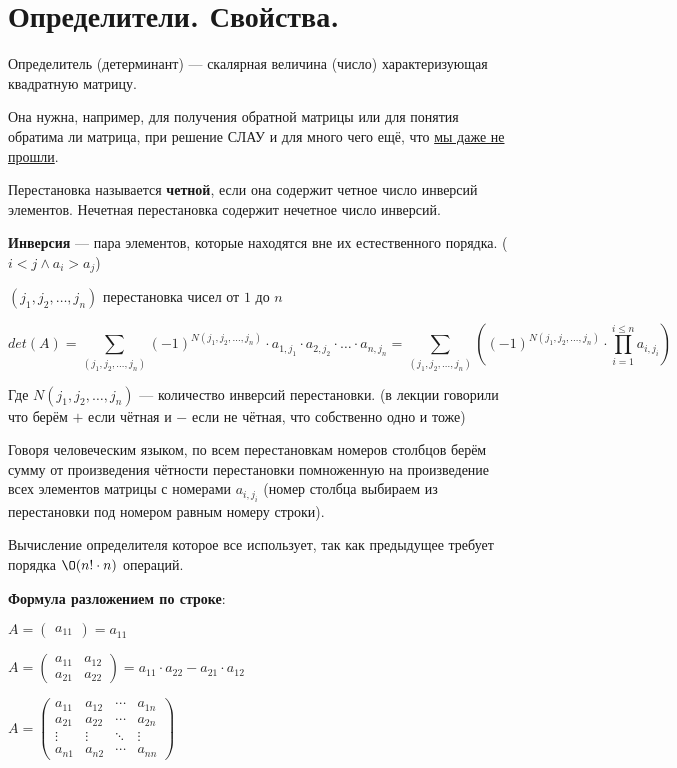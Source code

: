 \section{Определители. Свойства.}

Определитель (детерминант) --- скалярная величина (число) характеризующая квадратную матрицу.

Она нужна, например, для получения обратной матрицы или для понятия обратима ли матрица, при решение СЛАУ и для много чего ещё, что \href{https://math.stackexchange.com/a/160792}{мы даже не прошли}.

Перестановка называется {\bf четной}, если она содержит четное число инверсий элементов. Нечетная перестановка содержит нечетное число инверсий.  

{\bf Инверсия} --- пара элементов, которые находятся вне их естественного порядка. ($i < j \land a_i > a_j$)

$(j_1, j_2, \dots, j_n)$ перестановка чисел от $1$ до $n$

$$\displaystyle det(A) = \sum_{(j_1, j_2, \dots, j_n)} (-1) ^ {N(j_1, j_2, \dots, j_n)} \cdot a_{1, j_1}  \cdot a_{2, j_2} \cdot \dots \cdot  a_{n, j_n}  = \sum_{(j_1, j_2, \dots, j_n)} \left( (-1) ^ {N(j_1, j_2, \dots, j_n)} \cdot \prod_{i=1}^{i\le n} a_{i, j_i} \right)$$

Где $N(j_1, j_2, \dots, j_n)$ --- количество инверсий перестановки. (в лекции говорили что берём $+$ если чётная и $-$ если не чётная, что собственно одно  и тоже)

Говоря человеческим языком, по всем перестановкам номеров столбцов берём сумму от произведения чётности перестановки помноженную на  произведение всех элементов матрицы с номерами $a_{i, j_i}$ (номер столбца выбираем из перестановки под номером равным номеру строки).


Вычисление определителя которое все использует, так как предыдущее требует порядка $\O(n! \cdot n)$ операций.

{\bf Формула разложением по строке}:

$A =
\begin{pmatrix} a_{11}
\end{pmatrix} = a_{11}$

$A =
\begin{pmatrix} a_{11} & a_{12} 
	\\a_{21} & a_{22}
\end{pmatrix} = a_{11} \cdot a_{22} - a_{21} \cdot a_{12}$

$ A =
\begin{pmatrix} a_{11} & a_{12} & \cdots & a_{1n}
	\\a_{21} & a_{22} & \cdots & a_{2n}
	\\ \vdots & \vdots & \ddots & \vdots
	\\ a_{n1} & a_{n2} & \cdots & a_{nn}
\end{pmatrix}$

